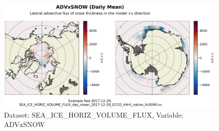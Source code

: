 \begin{figure}[H]
\centering
\includegraphics[scale=0.55]{../images/plots/native_plots/Sea-Ice_and_Snow_Horizontal_Volume_Fluxes/ADVxSNOW.png}
\caption{Dataset: SEA\_ICE\_HORIZ\_VOLUME\_FLUX, Variable: ADVxSNOW}
\label{tab:table-SEA_ICE_HORIZ_VOLUME_FLUX_ADVxSNOW-Plot}
\end{figure}
\pagebreak
